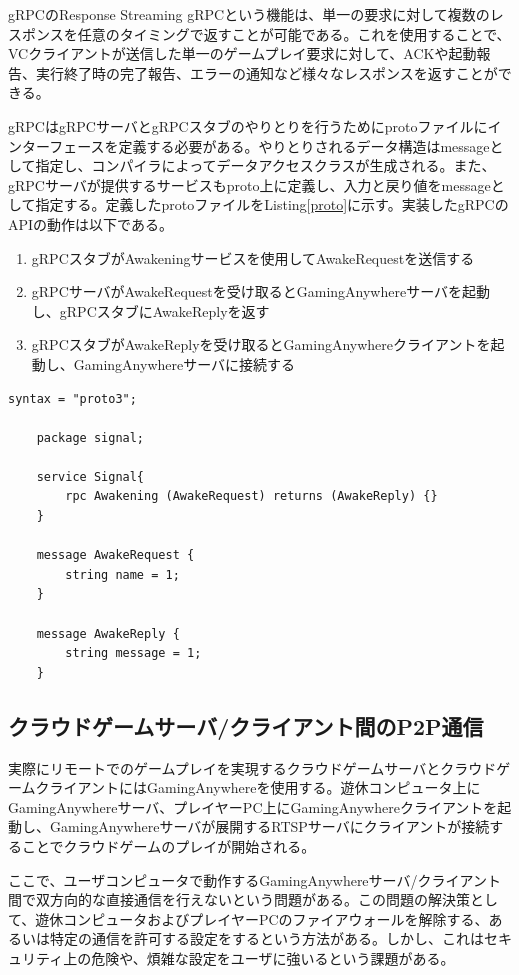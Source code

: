 gRPCのResponse Streaming gRPCという機能は、単一の要求に対して複数のレスポンスを任意のタイミングで返すことが可能である。これを使用することで、VCクライアントが送信した単一のゲームプレイ要求に対して、ACKや起動報告、実行終了時の完了報告、エラーの通知など様々なレスポンスを返すことができる。

gRPCはgRPCサーバとgRPCスタブのやりとりを行うためにprotoファイルにインターフェースを定義する必要がある。やりとりされるデータ構造はmessageとして指定し、コンパイラによってデータアクセスクラスが生成される。また、gRPCサーバが提供するサービスもproto上に定義し、入力と戻り値をmessageとして指定する。定義したprotoファイルをListing\ref{proto}に示す。実装したgRPCのAPIの動作は以下である。

\begin{enumerate}
    \item gRPCスタブがAwakeningサービスを使用してAwakeRequestを送信する
    \item gRPCサーバがAwakeRequestを受け取るとGamingAnywhereサーバを起動し、gRPCスタブにAwakeReplyを返す
    \item gRPCスタブがAwakeReplyを受け取るとGamingAnywhereクライアントを起動し、GamingAnywhereサーバに接続する
\end{enumerate}

\begin{lstlisting}[caption=protoファイル,label=proto]
    syntax = "proto3";

    package signal;

    service Signal{
        rpc Awakening (AwakeRequest) returns (AwakeReply) {}
    }

    message AwakeRequest {
        string name = 1;
    }

    message AwakeReply {
        string message = 1;
    }
\end{lstlisting}

\subsection{クラウドゲームサーバ/クライアント間のP2P通信}
実際にリモートでのゲームプレイを実現するクラウドゲームサーバとクラウドゲームクライアントにはGamingAnywhereを使用する。遊休コンピュータ上にGamingAnywhereサーバ、プレイヤーPC上にGamingAnywhereクライアントを起動し、GamingAnywhereサーバが展開するRTSPサーバにクライアントが接続することでクラウドゲームのプレイが開始される。

ここで、ユーザコンピュータで動作するGamingAnywhereサーバ/クライアント間で双方向的な直接通信を行えないという問題がある。この問題の解決策として、遊休コンピュータおよびプレイヤーPCのファイアウォールを解除する、あるいは特定の通信を許可する設定をするという方法がある。しかし、これはセキュリティ上の危険や、煩雑な設定をユーザに強いるという課題がある。

